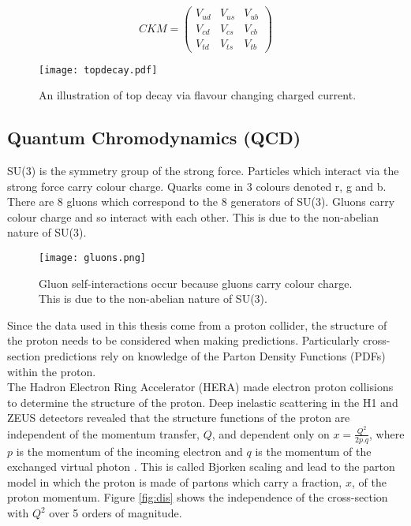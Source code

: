 \begin{equation}
CKM = \left( 
\begin{array}{ccc}
V_{ud} & V_{us} & V_{ub} \\
V_{cd} & V_{cs} & V_{cb} \\
V_{td} & V_{ts} & V_{tb} 
\end{array} 
\right) 
\label{eq:ckm}
\end{equation}

\begin{figure}
\begin{center}
\texttt{[image: topdecay.pdf]}
\end{center}
\caption{An illustration of top decay via flavour changing charged current.}
\label{fig:topdecay}
\end{figure}

\subsection{Quantum Chromodynamics (QCD)}

SU(3) is the symmetry group of the strong force. Particles which interact via
the strong force carry colour charge. Quarks come in 3 colours denoted r, g and 
b. There are 8 gluons which correspond to the 8 generators of SU(3). Gluons 
carry colour charge and so interact with each other. This is due to the 
non-abelian nature of SU(3). \\

\begin{figure}
\begin{center}
\texttt{[image: gluons.png]}
\end{center}
\caption{Gluon self-interactions occur because gluons carry colour charge. This
is due to the non-abelian nature of SU(3).}
\end{figure}

Since the data used in this thesis come from a proton collider, the structure
of the proton needs to be considered when making predictions. Particularly
cross-section predictions rely on knowledge of the Parton Density Functions
(PDFs) within the proton. \\

The Hadron Electron Ring Accelerator (HERA) made electron proton collisions to
determine the structure of the proton. Deep inelastic scattering in the H1
\cite{h1} and ZEUS \cite{zeus} detectors revealed that the structure functions 
of the proton are independent of the momentum transfer, $Q$, and dependent only 
on $x = \frac{Q^{2}}{2p.q}$, where $p$ is the momentum of the incoming electron
and $q$ is the momentum of the exchanged virtual photon \cite{bjorken}. This is 
called Bjorken scaling and lead to the parton model in which the proton is made 
of partons which carry a fraction, $x$, of the proton momentum. Figure 
\ref{fig:dis} shows the independence of the cross-section with $Q^{2}$ over 5 
orders of magnitude. \\

